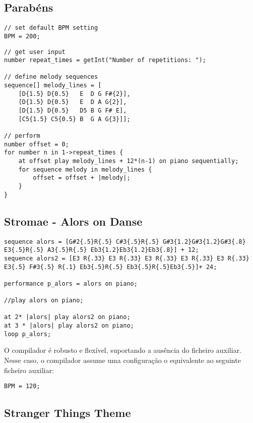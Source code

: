 \documentclass{article}
\begin{document}
\subsection{Parabéns}
\begin{lstlisting}[caption=bday.aux]
// set default BPM setting
BPM = 200;
\end{lstlisting}

\begin{lstlisting}[caption=bday.mux]
// get user input
number repeat_times = getInt("Number of repetitions: ");

// define melody sequences
sequence[] melody_lines = [
    [D{1.5} D{0.5}   E  D G F#{2}], 
    [D{1.5} D{0.5}   E  D A G{2}],
    [D{1.5} D{0.5}   D5 B G F# E],
    [C5{1.5} C5{0.5} B  G A G{3}]];

// perform
number offset = 0;
for number n in 1->repeat_times {
	at offset play melody_lines + 12*(n-1) on piano sequentially;
	for sequence melody in melody_lines {
		offset = offset + |melody|;
	}
}
\end{lstlisting}

\clearpage
\subsection{Stromae - Alors on Danse}
\begin{lstlisting}[caption=rap.mux]
sequence alors = [G#2{.5}R{.5} C#3{.5}R{.5} G#3{1.2}G#3{1.2}G#3{.8} E3{.5}R{.5} A3{.5}R{.5} Eb3{1.2}Eb3{1.2}Eb3{.8}] + 12;
sequence alors2 = [E3 R{.33} E3 R{.33} E3 R{.33} E3 R{.33} E3 R{.33} E3{.5} F#3{.5} R{.1} Eb3{.5}R{.5} Eb3{.5}R{.5}Eb3{.5}]+ 24;

performance p_alors = alors on piano;

//play alors on piano;

at 2* |alors| play alors2 on piano;
at 3 * |alors| play alors2 on piano;
loop p_alors;

\end{lstlisting}


O compilador é robusto e flexível, suportando a ausência do ficheiro auxiliar. Nesse caso, o compilador assume uma configuração o equivalente ao seguinte ficheiro auxiliar:
\begin{lstlisting}[caption=default.aux]
BPM = 120;
\end{lstlisting}

\clearpage
\subsection{Stranger Things Theme}
\end{document}
